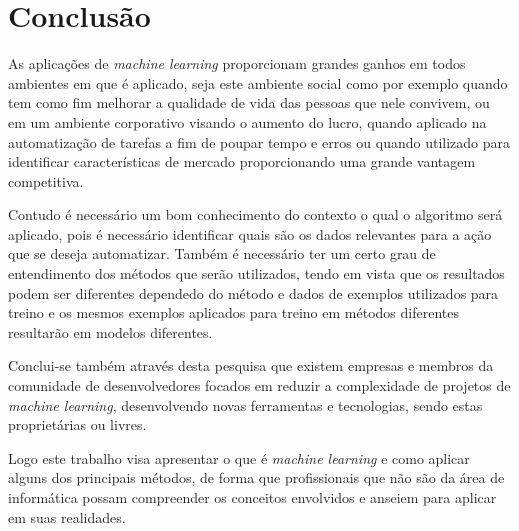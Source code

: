 \chapter{Conclusão}
\label{chap:conclusao}

As aplicações de \textit{machine learning} proporcionam grandes ganhos em todos ambientes em que é aplicado,
seja este ambiente social como por exemplo quando tem como fim melhorar a qualidade de vida das pessoas que nele
convivem, ou em um ambiente corporativo visando o aumento do lucro, quando aplicado na automatização de tarefas a fim de poupar 
tempo e erros ou quando utilizado para identificar características de mercado proporcionando uma grande vantagem competitiva.


Contudo é necessário um bom conhecimento do contexto o qual o algoritmo será aplicado, pois é necessário identificar quais são os dados 
relevantes para a ação que se deseja automatizar. Também é necessário ter um certo grau de entendimento dos métodos que serão utilizados, 
tendo em vista que os resultados podem ser diferentes dependedo do método e dados de exemplos utilizados para treino e os mesmos exemplos
aplicados para treino em métodos diferentes resultarão em modelos diferentes.


Conclui-se também através desta pesquisa que existem empresas e membros da comunidade de desenvolvedores focados em reduzir a complexidade
de projetos de \textit{machine learning}, desenvolvendo novas ferramentas e tecnologias, sendo estas proprietárias ou livres.


Logo este trabalho visa apresentar o que é \textit{machine learning} e como aplicar alguns dos principais métodos, de forma que profissionais 
que não são da área de informática possam compreender os conceitos envolvidos e anseiem para aplicar em suas realidades.         
